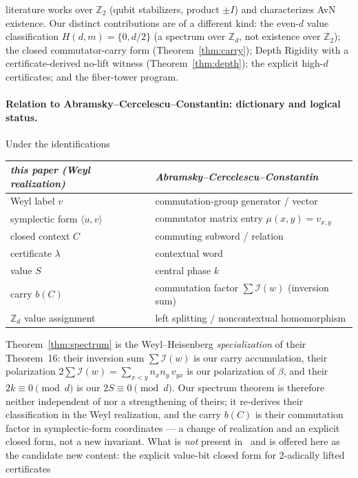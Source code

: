 \documentclass[11pt]{article}
\theoremstyle{remark}
\newcommand{\Z}{\mathbb{Z}}
\newcommand{\ip}[2]{\langle #1,#2\rangle}
\begin{document}
literature works over $\Z_2$ (qubit stabilizers, product $\pm I$) and characterizes AvN existence. Our
distinct contributions are of a different kind: the even-$d$ value classification $H(d,m)=\{0,d/2\}$ (a
spectrum over $\Z_d$, not existence over $\Z_2$); the closed commutator-carry form
(Theorem~\ref{thm:carry}); Depth Rigidity with a certificate-derived no-lift witness
(Theorem~\ref{thm:depth}); the explicit high-$d$ certificates; and the fiber-tower program.

\paragraph{Relation to Abramsky--Cercelescu--Constantin: dictionary and logical status.}
Under the identifications
\begin{center}\small
\begin{tabular}{ll}
\hline
\emph{this paper (Weyl realization)} & \emph{Abramsky--Cercelescu--Constantin~\cite{ACC24}}\\
\hline
Weyl label $v$ & commutation-group generator / vector\\
symplectic form $\ip{u}{v}$ & commutator matrix entry $\mu(x,y)=v_{x,y}$\\
closed context $C$ & commuting subword / relation\\
certificate $\lambda$ & contextual word\\
value $S$ & central phase $k$\\
carry $b(C)$ & commutation factor $\sum\mathcal I(w)$ (inversion sum)\\
$\Z_d$ value assignment & left splitting / noncontextual homomorphism\\
\hline
\end{tabular}
\end{center}
Theorem~\ref{thm:spectrum} is the Weyl--Heisenberg \emph{specialization} of their Theorem~16: their
inversion sum $\sum\mathcal I(w)$ is our carry accumulation, their polarization
$2\sum\mathcal I(w)=\sum_{x<y}n_xn_y\,v_{yx}$ is our polarization of $\beta$, and their $2k\equiv0\pmod d$
is our $2S\equiv0\pmod d$. Our spectrum theorem is therefore neither independent of nor a strengthening
of theirs; it re-derives their classification in the Weyl realization, and the carry $b(C)$ is their
commutation factor in symplectic-form coordinates --- a change of realization and an explicit closed
form, not a new invariant. What is \emph{not} present in~\cite{ACC24} and is offered here as the
candidate new content: the explicit value-bit closed form for $2$-adically lifted certificates
\end{document}
